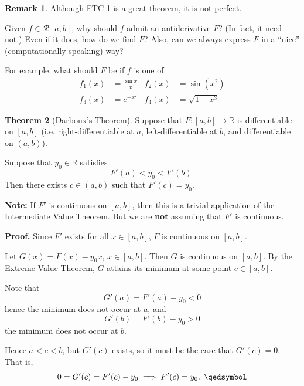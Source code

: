 \documentclass[11pt]{article}
\theoremstyle{definition}
\newtheorem{thm}{Theorem}[section]
\newtheorem{remark}[thm]{Remark}
\newcommand{\mbR}{\ensuremath{\mathbb{R}}}
\begin{document}
\begin{remark}
Although FTC-1 is a great theorem, it is not perfect. 

Given $f \in \mathcal{R}[a, b]$, why should $f$ admit an antiderivative $F$? (In fact, it need not.) 
Even if it does, how do we find $F$? Also, can we always express $F$ in a ``nice'' (computationally speaking) way? 

For example, what should $F$ be if $f$ is one of:
\begin{align*}
f_1(x) & = \frac{\sin x}{x} & f_2(x) & = \sin(x^2) \\
f_3(x) & = e^{-x^2} & f_4(x) & = \sqrt{1+x^3}
\end{align*}
\end{remark}

\begin{thm}[Darboux's Theorem]
Suppose that $F : [a, b] \to \mbR$ is differentiable on $[a, b]$ (i.e. right-differentiable at $a$, left-differentiable at $b$, and differentiable on $(a, b)$). 

Suppose that $y_0 \in \mbR$ satisfies
$$F'(a) < y_0 < F'(b) \text{.}$$
Then there exists $c \in (a, b)$ such that $F'(c) = y_0$. 

\textbf{Note:} If $F'$ is continuous on $[a, b]$, then this is a trivial application of the Intermediate Value Theorem. But we are \textbf{not} assuming that $F'$ is continuous.
\end{thm}
\textbf{Proof.} Since $F'$ exists for all $x \in [a, b]$, $F$ is continuous on $[a, b]$. 

Let $G(x) = F(x) - y_0x$, $x \in [a, b]$. Then $G$ is continuous on $[a, b]$. By the Extreme Value Theorem, $G$ attains its minimum at some point $c \in [a, b]$. 

Note that
$$G'(a) = F'(a) - y_0 < 0$$
hence the minimum does not occur at $a$, and
$$G'(b) = F'(b) - y_0 > 0$$
the minimum does not occur at $b$. 

Hence $a < c < b$, but $G'(c)$ exists, so it must be the case that $G'(c) = 0$. That is,
$$0 = G'(c) = F'(c) - y_0 \implies F'(c) = y_0 \text{. } \qedsymbol$$
\end{document}
